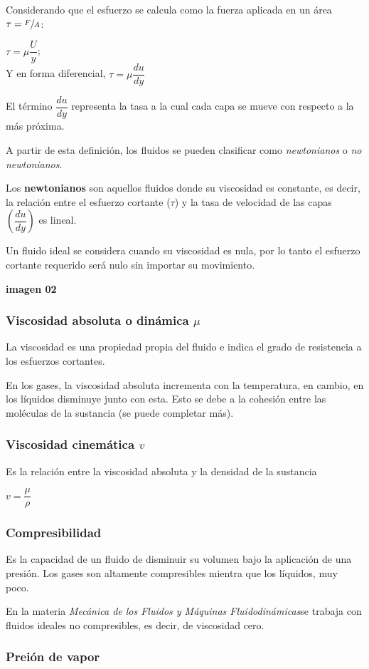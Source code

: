 \documentclass[11pt,a4paper]{article}
\newcommand{\materia}{\textit{Mecánica de los Fluidos y Máquinas Fluidodinámicas}}
\begin{document}
	Considerando que el esfuerzo se calcula como la fuerza aplicada en un área $\tau = \sfrac{F}{A}$:
	\begin{center}
		$\tau = \mu \dfrac{U}{y}$;\\ Y en forma diferencial, $\tau = \mu \dfrac{du}{dy}$
	\end{center}
	
	El término $\dfrac{du}{dy}$ representa la tasa a la cual cada capa se mueve con respecto a la más próxima.\\ \vspace{.5cm}
	
	A partir de esta definición, los fluidos se pueden clasificar como \textit{newtonianos} o \textit{no newtonianos}.
	
	
	Los \textbf{newtonianos} son aquellos fluidos donde su viscosidad es constante, es decir, la relación entre el esfuerzo cortante ($\tau$) y la tasa de velocidad de las capas $\left(\dfrac{du}{dy}\right)$ es lineal.
	
	Un fluido ideal se considera cuando su viscosidad es nula, por lo tanto el esfuerzo cortante requerido será nulo sin importar su movimiento.
	
	\begin{center}
		\textbf{imagen 02}
	\end{center}
	
	\subsubsection{Viscosidad absoluta o dinámica $\mu$}
	La viscosidad es una propiedad propia del fluido e indica el grado de resistencia a los esfuerzos cortantes.
	
	En los gases, la viscosidad absoluta incrementa con la temperatura, en cambio, en los líquidos disminuye junto con esta. Esto se debe a la cohesión entre las moléculas de la sustancia (se puede completar más).
	
	\subsubsection{Viscosidad cinemática $v$}
	
	Es la relación entre la viscosidad absoluta y la densidad de la sustancia
	\begin{center}
		$v = \dfrac{\mu}{\rho}$
	\end{center}
	
	\subsubsection{Compresibilidad}
	Es la capacidad de un fluido de disminuir su volumen bajo la aplicación de una presión. Los gases son altamente compresibles mientra que los líquidos, muy poco. 
	
	En la materia \materia se trabaja con fluidos ideales no compresibles, es decir, de viscosidad cero.
	
	\subsubsection{Preión de vapor}
	
	
\end{document}
